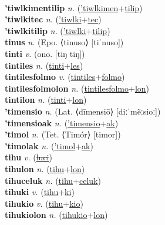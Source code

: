  \label{'tiwlkimentec} \\
\textbf{'tiwlkimentilip} \textit{n.} (\hyperref['tiwlkimen]{'tiwlkimen}+\hyperref[tilip]{tilip})
 \label{'tiwlkimentilip} \\
\textbf{'tiwlkitec} \textit{n.} (\hyperref['tiwlki]{'tiwlki}+\hyperref[tec]{tec})
 \label{'tiwlkitec} \\
\textbf{'tiwlkitilip} \textit{n.} (\hyperref['tiwlki]{'tiwlki}+\hyperref[tilip]{tilip})
 \label{'tiwlkitilip} \\
\textbf{tinus} \textit{n.} (Epo. ⟨tinuso⟩ [tiˈnuso])
 \label{tinus} \\
\textbf{tinti} \textit{v.} (ono. [tiŋ tiŋ])
 \label{tinti} \\
\textbf{tintiles} \textit{n.} (\hyperref[tinti]{tinti}+\hyperref[les]{les})
 \label{tintiles} \\
\textbf{tintilesfolmo} \textit{v.} (\hyperref[tintiles]{tintiles}+\hyperref[folmo]{folmo})
 \label{tintilesfolmo} \\
\textbf{tintilesfolmolon} \textit{n.} (\hyperref[tintilesfolmo]{tintilesfolmo}+\hyperref[lon]{lon})
 \label{tintilesfolmolon} \\
\textbf{tintilon} \textit{n.} (\hyperref[tinti]{tinti}+\hyperref[lon]{lon})
 \label{tintilon} \\
\textbf{'timensio} \textit{n.} (Lat. ⟨dīmensiō⟩ [diːˈmẽːsioː])
 \label{'timensio} \\
\textbf{'timensioak} \textit{n.} (\hyperref['timensio]{'timensio}+\hyperref[ak]{ak})
 \label{'timensioak} \\
\textbf{'timol} \textit{n.} (Tet. ⟨Timór⟩ [timor])
 \label{'timol} \\
\textbf{'timolak} \textit{n.} (\hyperref['timol]{'timol}+\hyperref[ak]{ak})
 \label{'timolak} \\
\textbf{tihu} \textit{v.} (\hyperref[luci]{\sout{luci}})
 \label{tihu} \\
\textbf{tihulon} \textit{n.} (\hyperref[tihu]{tihu}+\hyperref[lon]{lon})
 \label{tihulon} \\
\textbf{tihuceluk} \textit{n.} (\hyperref[tihu]{tihu}+\hyperref[celuk]{celuk})
 \label{tihuceluk} \\
\textbf{tihuki} \textit{v.} (\hyperref[tihu]{tihu}+\hyperref[ki]{ki})
 \label{tihuki} \\
\textbf{tihukio} \textit{v.} (\hyperref[tihu]{tihu}+\hyperref[kio]{kio})
 \label{tihukio} \\
\textbf{tihukiolon} \textit{n.} (\hyperref[tihukio]{tihukio}+\hyperref[lon]{lon})
 \label{tihukiolon} \\
